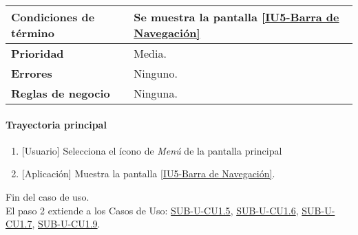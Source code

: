 \begin{longtable}{|J{5cm}|J{10.3cm}|}
		\\ \hline
	\textbf{Condiciones de término} & Se muestra la pantalla \hyperref[fig:Barra de navegacion]{[IU5-Barra de Navegación]}
		\\ \hline 
	\textbf{Prioridad} & 
		Media. \\ \hline
	\textbf{Errores} & Ninguno.
		\\ \hline
	\textbf{Reglas de negocio} & Ninguna.
		 \\ \hline
\end{longtable}

\paragraph{Trayectoria principal}
	\begin{enumerate}
		\item {[Usuario]} Selecciona el ícono de \textit{Menú} de la pantalla principal %
		\item {[Aplicación]} Muestra la pantalla \hyperref[fig:Barra de navegacion]{[IU5-Barra de Navegación]}.
	\end{enumerate}
	Fin del caso de uso.\\
	El paso 2 extiende a los Casos de Uso: \hyperref[SUB-U-CU1.5]{SUB-U-CU1.5}, \hyperref[SUB-U-CU1.6]{SUB-U-CU1.6}, \hyperref[SUB-U-CU1.7]{SUB-U-CU1.7}, \hyperref[SUB-U-CU1.9]{SUB-U-CU1.9}.
	
	

